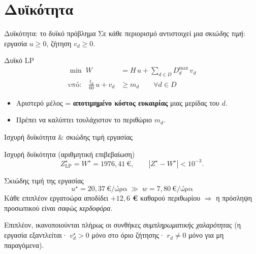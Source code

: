 \documentclass[aspectratio=169,11pt]{beamer}
\newcommand{\en}[1]{\textenglish{#1}}
\begin{document}
\section{Δυϊκότητα}
\begin{frame}{Δυϊκότητα: το δυϊκό πρόβλημα}
  Σε κάθε περιορισμό αντιστοιχεί μια \emph{σκιώδης τιμή}: εργασία $u\ge0$, ζήτηση
  $v_d\ge0$.
  \begin{block}{Δυϊκό \en{LP}}
  \vspace{-0.6em}
  \begin{align*}
    \min\; W &= H\,u + \sum_{d\in D} D_d^{\max}\, v_d\\
    \text{υπό:}\quad \tfrac{t_d}{60}\,u + v_d &\ge m_d \qquad \forall d\in D
  \end{align*}
  \end{block}
  \begin{itemize}
    \item Αριστερό μέλος = \textbf{αποτιμημένο κόστος ευκαιρίας} μιας μερίδας του $d$.
    \item Πρέπει να καλύπτει τουλάχιστον το περιθώριο $m_d$.
  \end{itemize}
\end{frame}

\begin{frame}{Ισχυρή δυϊκότητα \& σκιώδης τιμή εργασίας}
  \begin{block}{Ισχυρή δυϊκότητα (αριθμητική επιβεβαίωση)}
    \[
      Z^\star_{\mathrm{LP}} = W^\star = 1976{,}41\ €,\qquad |Z^\star - W^\star| < 10^{-3}.
    \]
  \end{block}
  \begin{alertblock}{Σκιώδης τιμή της εργασίας}
    \[
      u^\star = 20{,}37\ €/\text{ώρα} \;\gg\; w = 7{,}80\ €/\text{ώρα}
    \]
    Κάθε επιπλέον εργατοώρα αποδίδει \textbf{$+12{,}6$ €} καθαρού περιθωρίου
    $\Rightarrow$ η πρόσληψη προσωπικού είναι σαφώς \emph{κερδοφόρα}.
  \end{alertblock}
  \footnotesize Επιπλέον, ικανοποιούνται πλήρως οι συνθήκες
  \emph{συμπληρωματικής χαλαρότητας} (η εργασία εξαντλείται· $v_d^\star>0$ μόνο στο
  όριο ζήτησης· $r_d\ne0$ μόνο για μη παραγόμενα).
\end{frame}
\end{document}
